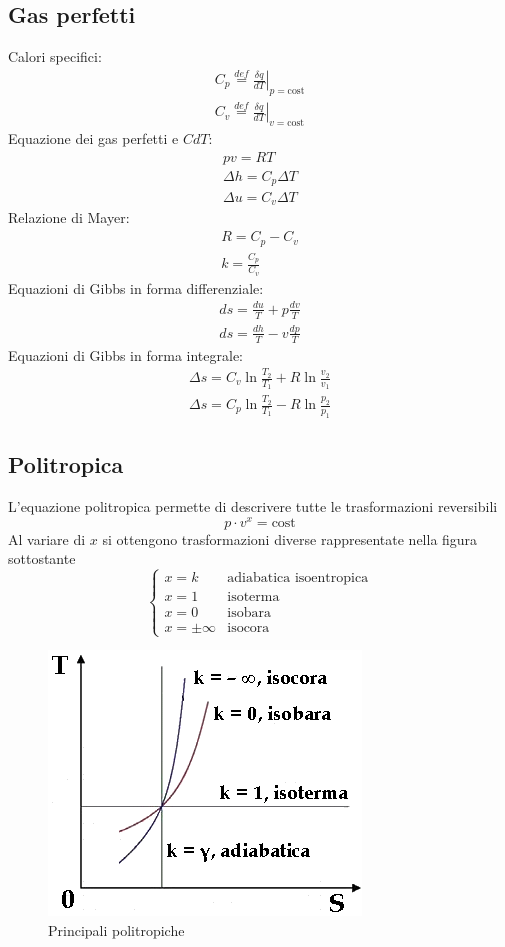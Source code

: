 \documentclass[a4paper,12pt]{article}
\begin{document}
\subsection{Gas perfetti}
Calori specifici:
\begin{gather}
    C_p \stackrel{def}{=} \left.\frac{\delta q}{dT}\right|_{p=\text{cost}}\\
    C_v \stackrel{def}{=} \left.\frac{\delta q}{dT}\right|_{v=\text{cost}}
\end{gather}
Equazione dei gas perfetti e \(CdT\):
\begin{gather}
    pv=RT\\
    \Delta h=C_p\Delta T\\
    \Delta u=C_v\Delta T
\end{gather}
Relazione di Mayer:
\begin{gather}
    R = C_p - C_v\\
    k = \frac{C_p}{C_v}
\end{gather}
Equazioni di Gibbs in forma differenziale:
\begin{gather}
    ds = \frac{du}{T} + p\frac{dv}{T}\\
    ds = \frac{dh}{T} - v\frac{dp}{T}
\end{gather}
Equazioni di Gibbs in forma integrale:
\begin{gather}
     \Delta s = C_v \ln{\frac{T_2}{T_1}} + R \ln{\frac{v_2}{v_1}} \\
    \Delta s = C_p \ln{\frac{T_2}{T_1}} - R \ln{\frac{p_2}{p_1}}
\end{gather}
\subsection{Politropica}
\label{subsec:politropica}
L'equazione politropica permette di descrivere tutte le trasformazioni reversibili
\begin{equation}
    \label{eq:politropica}
     p\cdot v^x=\text{cost}
\end{equation}
Al variare di \(x\) si ottengono trasformazioni diverse rappresentate nella figura 
sottostante
\[\begin{cases}
    x=k & \text{adiabatica isoentropica}\\
    x=1 & \text{isoterma}\\
     x=0 & \text{isobara}\\
     x=\pm\infty & \text{isocora}
\end{cases}\]
\begin{figure}[H]
    \label{fig:politropiche}
    \centering
    \includegraphics[width=0.5\linewidth]{media/politropiche.png}
    \caption{Principali politropiche}
\end{figure}
\end{document}
